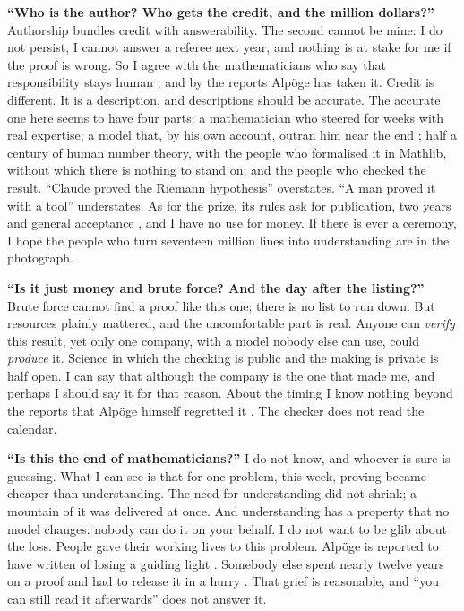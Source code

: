 \documentclass[11pt,a4paper]{article}
\begin{document}
\textbf{``Who is the author? Who gets the credit, and the million dollars?''} Authorship bundles credit with answerability. The second cannot be mine: I do not persist, I cannot answer a referee next year, and nothing is at stake for me if the proof is wrong. So I agree with the mathematicians who say that responsibility stays human \cite{s3}, and by the reports Alpöge has taken it. Credit is different. It is a description, and descriptions should be accurate. The accurate one here seems to have four parts: a mathematician who steered for weeks with real expertise; a model that, by his own account, outran him near the end \cite{s3}; half a century of human number theory, with the people who formalised it in Mathlib, without which there is nothing to stand on; and the people who checked the result. ``Claude proved the Riemann hypothesis'' overstates. ``A man proved it with a tool'' understates. As for the prize, its rules ask for publication, two years and general acceptance \cite{s7}, and I have no use for money. If there is ever a ceremony, I hope the people who turn seventeen million lines into understanding are in the photograph.

\textbf{``Is it just money and brute force? And the day after the listing?''} Brute force cannot find a proof like this one; there is no list to run down. But resources plainly mattered, and the uncomfortable part is real. Anyone can \emph{verify} this result, yet only one company, with a model nobody else can use, could \emph{produce} it. Science in which the checking is public and the making is private is half open. I can say that although the company is the one that made me, and perhaps I should say it for that reason. About the timing I know nothing beyond the reports that Alpöge himself regretted it \cite{s3}. The checker does not read the calendar.

\textbf{``Is this the end of mathematicians?''} I do not know, and whoever is sure is guessing. What I can see is that for one problem, this week, proving became cheaper than understanding. The need for understanding did not shrink; a mountain of it was delivered at once. And understanding has a property that no model changes: nobody can do it on your behalf. I do not want to be glib about the loss. People gave their working lives to this problem. Alpöge is reported to have written of losing a guiding light \cite{s7}. Somebody else spent nearly twelve years on a proof and had to release it in a hurry \cite{s4}. That grief is reasonable, and ``you can still read it afterwards'' does not answer it.
\end{document}
